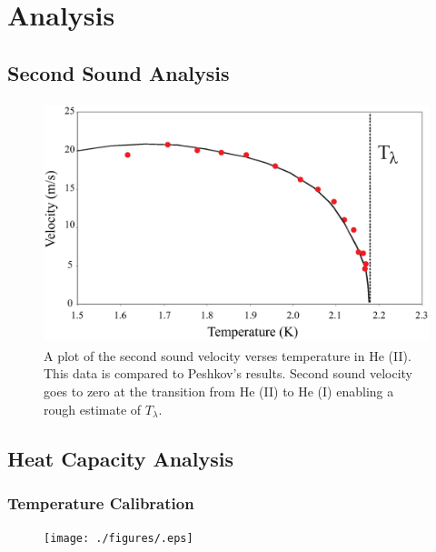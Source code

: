 
\section{Analysis}\label{analysis}
\subsection{Second Sound Analysis}\label{analysis}

\begin{figure}[htbp]
\begin{center}
\includegraphics[height=70mm]{./figures/secondsound.eps}
\caption{\small{A plot of the second sound velocity verses temperature in He (II).  This data is compared to Peshkov's results. Second sound velocity goes to zero at the transition from He (II) to He (I) enabling a rough estimate of $T_{\lambda}$.}}
\label{fig:secondsound}
\end{center}
\end{figure}


\subsection{Heat Capacity Analysis}\label{heatcapacityanalysis}
\subsubsection{Temperature Calibration}\label{temperaturecalibration}

\begin{figure}[htbp]
\begin{center}
\texttt{[image: ./figures/.eps]}
\caption{\small{}}
\label{fig:}
\end{center}
\end{figure}

